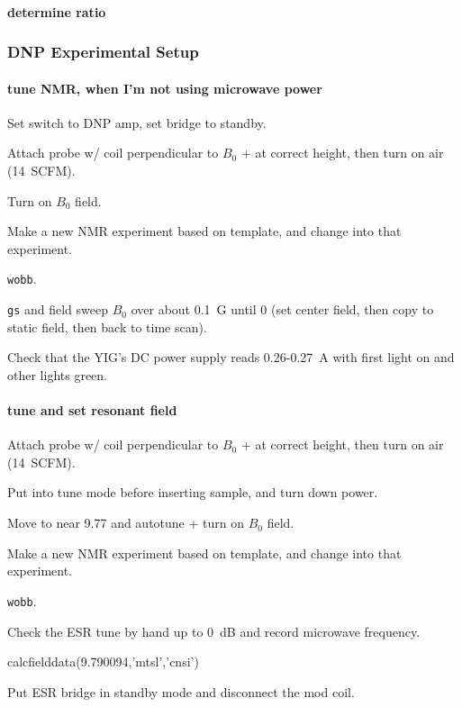 \paragraph{determine ratio}
\subsubsection{DNP Experimental Setup}

\paragraph{tune NMR, when I'm not using microwave power}
Set switch to DNP amp, set bridge to standby.

Attach probe w/ coil perpendicular to $B_0$ + at correct height, then turn on air (14~SCFM).

Turn on $B_0$ field.

Make a new NMR experiment based on template, and change into that experiment.

\texttt{wobb}. 

\texttt{gs} and field sweep $B_0$ over about 0.1~G until 0 (set center field, then copy to static field, then back to time scan).

Check that the YIG's DC power supply reads 0.26-0.27~A with first light on and other lights green.

\paragraph{tune and set resonant field}
Attach probe w/ coil perpendicular to $B_0$ + at correct height, then turn on air (14~SCFM).

Put into tune mode before inserting sample, and turn down power.

Move to near 9.77 and autotune + turn on $B_0$ field.

Make a new NMR experiment based on template, and change into that experiment.

\texttt{wobb}. 

Check the ESR tune by hand up to 0~dB and record microwave frequency.
\begin{python}[off]
calcfielddata(9.790094,'mtsl','cnsi')
\end{python}
Put ESR bridge in standby mode and disconnect the mod coil.

